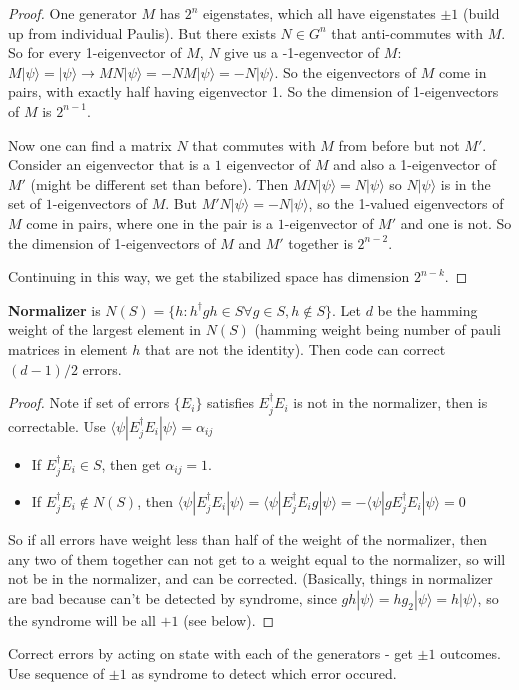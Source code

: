 \documentclass[12pt]{article}
\begin{document}
\begin{proof}
One generator $M$ has $2^n$ eigenstates, which all have eigenstates $\pm 1$ (build up from individual Paulis). But there exists $N\in G^n$ that anti-commutes with $M$. So for every 1-eigenvector of $M$, $N$ give us a -1-egenvector of $M$: $M|\psi\rangle=|\psi\rangle\rightarrow MN|\psi\rangle=-NM|\psi\rangle=-N|\psi\rangle$. So the eigenvectors of $M$ come in pairs, with exactly half having eigenvector 1. So the dimension of 1-eigenvectors of $M$ is $2^{n-1}$.

Now one can find a matrix $N$ that commutes with $M$ from before but not $M'$.  Consider an eigenvector that is a $1$ eigenvector of $M$ and also a 1-eigenvector of $M'$ (might be different set than before). Then $MN|\psi\rangle=N|\psi\rangle$ so $N|\psi\rangle$ is in the set of $1$-eigenvectors of $M$. But $M'N|\psi\rangle=-N|\psi\rangle$, so the 1-valued eigenvectors of $M$ come in pairs, where one in the pair is a $1$-eigenvector of $M'$ and one is not. So the dimension of 1-eigenvectors of $M$ and $M'$ together is $2^{n-2}$.

Continuing in this way, we get the stabilized space has dimension $2^{n-k}$.
\end{proof}

{\bf{Normalizer}} is $N(S)=\{h: h^\dagger gh \in S\forall  g\in S, h\notin  S\}$. Let $d$ be the hamming weight of the largest element in $N(S)$ (hamming weight being number of pauli matrices in element $h$ that are not the identity). Then code can correct $(d-1)/2$ errors.

\begin{proof}
Note if set of errors $\{E_i\}$ satisfies $E_j^\dagger E_i$ is not in the normalizer, then is correctable. Use  $\langle\psi|E_j^\dagger E_i|\psi\rangle=\alpha_{ij}$
\begin{itemize}
\item If $E_j^\dagger E_i\in S$, then get $\alpha_{ij}=1$.
\item If  $E_j^\dagger E_i\notin N(S)$, then   $\langle\psi|E_j^\dagger E_i|\psi\rangle=\langle\psi|E_j^\dagger E_ig|\psi\rangle= -\langle\psi|gE_j^\dagger E_i|\psi\rangle=0$
\end{itemize}
So if all errors have weight less than half of the weight of the normalizer, then any two of them together can not get to a weight equal to the normalizer, so will not be in the normalizer, and can be corrected. (Basically, things in normalizer are bad because can't be detected by syndrome, since $gh|\psi\rangle=hg_2|\psi\rangle=h|\psi\rangle$, so the syndrome will be all $+1$ (see below).
\end{proof}
Correct errors by acting on state with each of the generators - get $\pm 1$ outcomes. Use sequence of $\pm 1$ as syndrome to detect which error occured.
\end{document}
